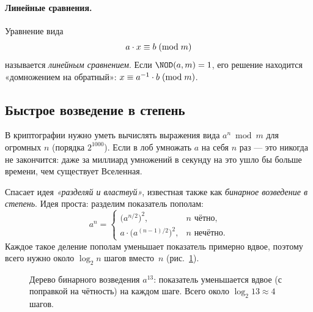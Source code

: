 \paragraph*{Линейные сравнения.} Уравнение вида
\[
a\cdot x \equiv b \;(\mathrm{mod}\;m)
\]
называется \emph{линейным сравнением}. Если $\NOD(a,m) = 1$, его решение находится «домножением на обратный»: $x \equiv a^{-1}\cdot b \;(\mathrm{mod}\;m)$.

\subsection{Быстрое возведение в степень}
\label{subsec:fastpow}

В криптографии нужно уметь вычислять выражения вида $a^n \bmod m$ для огромных $n$ (порядка $2^{1000}$). Если в лоб умножать $a$ на себя $n$ раз --- это никогда не закончится: даже за миллиард умножений в секунду на это ушло бы больше времени, чем существует Вселенная.

Спасает идея \emph{«разделяй и властвуй»}, известная также как \emph{бинарное возведение в степень}. Идея проста: разделим показатель пополам:
\[
a^n = \begin{cases}
\bigl(a^{n/2}\bigr)^2, & n\text{ чётно},\\[2pt]
a\cdot \bigl(a^{(n-1)/2}\bigr)^2, & n\text{ нечётно}.
\end{cases}
\]
Каждое такое деление пополам уменьшает показатель примерно вдвое, поэтому всего нужно около $\log_2 n$ шагов вместо~$n$ (рис.~\ref{fig:binpow}).

\begin{figure}[H]
\centering
{}
\caption{Дерево бинарного возведения $a^{13}$: показатель уменьшается вдвое (с поправкой на чётность) на каждом шаге. Всего около $\log_2 13 \approx 4$ шагов.}
\label{fig:binpow}
\end{figure}

